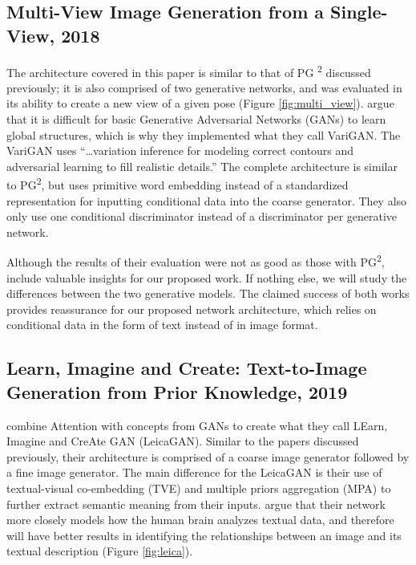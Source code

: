 \documentclass{article}
\begin{document}
\subsection*{Multi-View Image Generation from a Single-View, 2018}
\nocite{multi_view}
The architecture covered in this paper is similar to that of PG
\textsuperscript{2}
discussed previously; it is also comprised of two generative
networks, and was evaluated in its ability to create a new view of a given pose
(Figure \ref{fig:multi_view}).
\cite{multi_view} argue that it is difficult for basic
Generative Adversarial Networks (GANs) to learn global structures,
which is why they implemented what they
call VariGAN. The VariGAN uses
``\dots variation inference for modeling correct contours and adversarial
learning to fill realistic details.'' The complete architecture
is similar to PG\textsuperscript{2}, but uses primitive word embedding instead of
a standardized representation for inputting conditional data into the coarse
generator. They also only use one conditional discriminator instead of a 
discriminator per generative network.

Although the results of their evaluation were not as good as those with
PG\textsuperscript{2}, \cite{multi_view} include valuable insights for
our proposed work. If nothing else, we will study the differences between the two
generative models. The claimed success of both works provides reassurance for our
proposed network architecture, which relies on conditional data in the form of
text instead of in image format.

\subsection*{Learn, Imagine and Create: Text-to-Image Generation from Prior Knowledge, 2019}
\nocite{leica}
\cite{leica} combine Attention with concepts from GANs to create what they call
LEarn, Imagine and CreAte GAN (LeicaGAN). Similar to the papers discussed
previously, their architecture is comprised of a coarse image generator followed
by a fine image generator. The main difference for the LeicaGAN is their use
of textual-visual co-embedding (TVE) and multiple priors aggregation (MPA)
to further extract semantic meaning from their inputs. \cite{leica} argue that
their network more closely models how the human brain analyzes textual data,
and therefore will have better results in identifying the relationships between
an image and its textual description (Figure \ref{fig:leica}).
\end{document}
